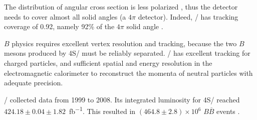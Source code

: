 The distribution of angular cross section is less
polarized \cite{Boutigny:1995ib,McGregor:2008ek}, thus the detector needs to
cover almost all solid angles (a $4\pi$ detector).
Indeed, \BaBar/ has tracking coverage of 0.92, namely 92\% of the $4\pi$ solid
angle \cite{Harrison:1998yr}.

$B$ physics requires excellent vertex resolution and tracking, because the two
$B$ mesons produced by \Y4S/ must be reliably separated.
\BaBar/ has excellent tracking for charged particles, and sufficient spatial
and energy resolution in the electromagnetic calorimeter to reconstruct the momenta of neutral
particles \cite{Harrison:1998yr,Bauer:2005} with adequate precision.

\BaBar/ collected data from 1999 to 2008. Its integrated luminosity for \Y4S/
reached $424.18 \pm 0.04 \pm 1.82$~\si{fb^{-1}}.
This resulted in $(464.8 \pm 2.8) \times 10^6$ $B \overline{B}$
events \cite{Lees:2013rw}.
